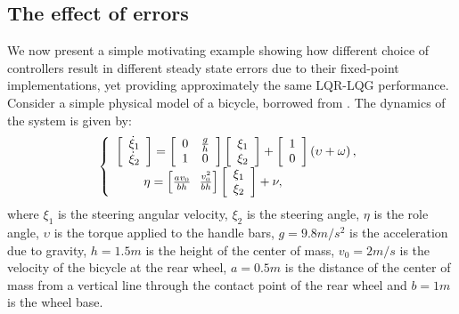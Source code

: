 \documentclass{amsart}
\numberwithin{equation}{section}
\def\myparagraph#1{{\smallskip\noindent{\bf #1}}}
\begin{document}
\subsection{The effect of errors}

\myparagraph{Example}
We now present a simple motivating example showing how different choice of
controllers result in different steady state errors due to their fixed-point implementations, 
yet providing approximately the same LQR-LQG performance. 
Consider a simple physical model of a bicycle, borrowed from \cite{astrom}. 
The dynamics of the system is given by:
\begin{align}
\label{bicycle}
\left\{\begin{array}{l}\left[{\begin{array}{c}
\dot\xi_1\\
\dot\xi_2\\
 \end{array}}\right]=\left[ {\begin{array}{cc}
0&\frac{g}{h} \\
1&0\\
 \end{array}}\right]\left[{\begin{array}{c}
\xi_1\\
\xi_2\\
 \end{array}}\right]+\left[ {\begin{array}{c}
1\\
0\\
 \end{array}}\right]\left(\upsilon+\omega\right),\\ \hspace{7.8mm}\eta=\left[\frac{av_0}{bh}~~\frac{v_0^2}{bh}\right]\left[{\begin{array}{c}
\xi_1\\
\xi_2\\
 \end{array}}\right]+\nu,\end{array}\right.
\end{align}
where $\xi_1$ is the steering angular velocity, $\xi_2$ is the steering angle, $\eta$ is the role angle, $\upsilon$ is the torque applied to the handle bars, 
$g=9.8m/s^2$ is the acceleration due to gravity, $h=1.5m$ is the height of the center of mass, 
$v_0=2m/s$ is the velocity of the bicycle at the rear wheel, 
$a=0.5m$ is the distance of the center of mass from a vertical line through the contact point of the rear wheel and $b=1m$ is the wheel base. 
\end{document}
